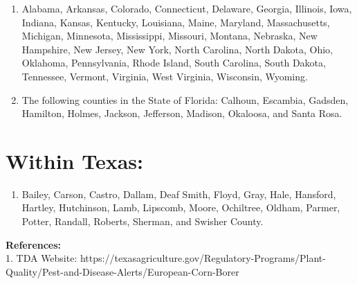 \documentclass[12pt]{exam}
\begin{document}
\begin{enumerate}
\item  Alabama, Arkansas, Colorado, Connecticut, Delaware, Georgia, Illinois, Iowa, Indiana, Kansas, Kentucky, Louisiana, Maine, Maryland, Massachusetts, Michigan, Minnesota, Mississippi, Missouri, Montana, Nebraska, New Hampshire, New Jersey, New York, North Carolina, North Dakota, Ohio, Oklahoma, Pennsylvania, Rhode Island, South Carolina, South Dakota, Tennessee, Vermont, Virginia, West Virginia, Wisconsin, Wyoming.
\item The following counties in the State of Florida: Calhoun, Escambia, Gadsden, Hamilton, Holmes, Jackson, Jefferson, Madison, Okaloosa, and Santa Rosa.
\end{enumerate}

\section{Within Texas:}
\begin{enumerate}
\item Bailey, Carson, Castro, Dallam, Deaf Smith, Floyd, Gray, Hale, Hansford, Hartley, Hutchinson, Lamb, Lipscomb, Moore, Ochiltree, Oldham, Parmer, Potter, Randall, Roberts, Sherman, and Swisher County.
\end{enumerate}
\newpage
\textbf{References:}\\
1. TDA Website: https://texasagriculture.gov/Regulatory-Programs/Plant-Quality/Pest-and-Disease-Alerts/European-Corn-Borer
\end{document}

